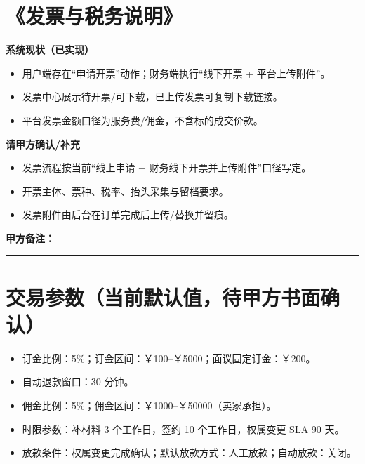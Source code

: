 \documentclass[12pt,a4paper]{ctexart}
\newcommand{\clientnote}{
\vspace{0.3em}
\noindent\textbf{甲方备注：}\par
\vspace{0.3em}
\noindent\rule{\textwidth}{0.4pt}\par
\vspace{1.0em}
}
\begin{document}
\section{《发票与税务说明》}
\textbf{系统现状（已实现）}
\begin{itemize}
  \item 用户端存在“申请开票”动作；财务端执行“线下开票 + 平台上传附件”。
  \item 发票中心展示待开票/可下载，已上传发票可复制下载链接。
  \item 平台发票金额口径为服务费/佣金，不含标的成交价款。
\end{itemize}
\textbf{请甲方确认/补充}
\begin{itemize}
  \item 发票流程按当前“线上申请 + 财务线下开票并上传附件”口径写定。
  \item 开票主体、票种、税率、抬头采集与留档要求。
  \item 发票附件由后台在订单完成后上传/替换并留痕。
\end{itemize}
\clientnote

\section*{交易参数（当前默认值，待甲方书面确认）}
\begin{itemize}
  \item 订金比例：5\%；订金区间：￥100--￥5000；面议固定订金：￥200。
  \item 自动退款窗口：30 分钟。
  \item 佣金比例：5\%；佣金区间：￥1000--￥50000（卖家承担）。
  \item 时限参数：补材料 3 个工作日，签约 10 个工作日，权属变更 SLA 90 天。
  \item 放款条件：权属变更完成确认；默认放款方式：人工放款；自动放款：关闭。
\end{itemize}
\end{document}
